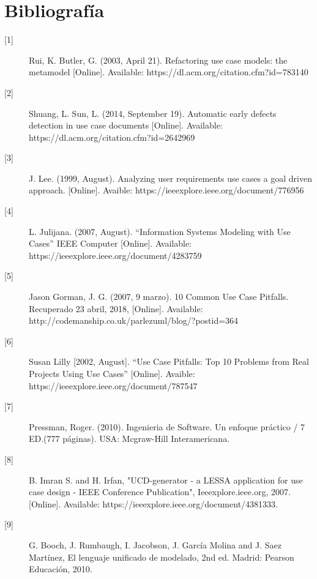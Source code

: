 \chapter{Bibliografía}

\begin{description}
	
		\item[\hypertarget{b01}{[1]}] Rui, K. Butler, G. (2003, April 21). Refactoring use case models: the metamodel [Online]. Available: https://dl.acm.org/citation.cfm?id=783140
		
		\item[\hypertarget{b02}{[2]}] Shuang, L. Sun, L. (2014, September 19). Automatic early defects detection in use case documents [Online]. Available: https://dl.acm.org/citation.cfm?id=2642969
		
		\item[\hypertarget{b03}{[3]}] 
		J. Lee. (1999, August). Analyzing user requirements use cases a goal driven approach. [Online]. Avaible: https://ieeexplore.ieee.org/document/776956
		
		\item[\hypertarget{b04}{[4]}]  L. Julijana. (2007, August). “Information Systems Modeling with Use Cases” IEEE Computer [Online]. Available:
		https://ieeexplore.ieee.org/document/4283759
		
		\item[\hypertarget{b05}{[5]}] Jason Gorman, J. G. (2007, 9 marzo). 10 Common Use Case Pitfalls. Recuperado 23 abril, 2018,  [Online]. Available: http://codemanship.co.uk/parlezuml/blog/?postid=364
		
		\item[\hypertarget{b06}{[6]}] Susan Lilly [2002, August]. “Use Case Pitfalls: Top 10 Problems from Real Projects Using Use Cases” [Online]. Avaible: https://ieeexplore.ieee.org/document/787547
		
		\item[\hypertarget{b07}{[7]}] Pressman, Roger. (2010). Ingenieria de Software. Un enfoque práctico / 7 ED.(777 páginas). USA: Mcgraw-Hill Interamericana.
		
		\item[\hypertarget{b08}{[8]}] B. Imran S. and H. Irfan, "UCD-generator - a LESSA application for use case design - IEEE Conference Publication", Ieeexplore.ieee.org, 2007. [Online]. Available: https://ieeexplore.ieee.org/document/4381333.
		
		\item[\hypertarget{b09}{[9]}] G. Booch, J. Rumbaugh, I. Jacobson, J. García Molina and J. Saez Martínez, El lenguaje unificado de modelado, 2nd ed. Madrid: Pearson Educación, 2010.
		

\end{description}
